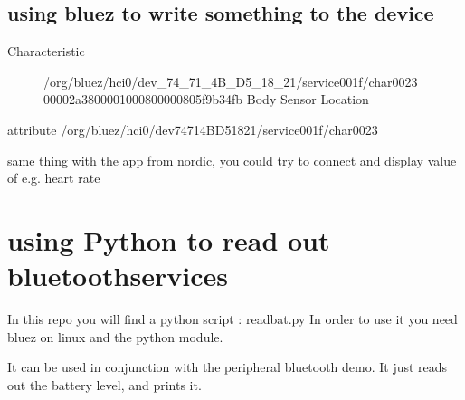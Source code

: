 \documentclass[letterpaper,10pt,english]{sphinxmanual}
\begin{document}
\subsection{using bluez to write something to the device}
\label{\detokenize{bluetooth:using-bluez-to-write-something-to-the-device}}\begin{description}
\item[{Characteristic}] \leavevmode
/org/bluez/hci0/dev\_74\_71\_4B\_D5\_18\_21/service001f/char0023
00002a38\sphinxhyphen{}0000\sphinxhyphen{}1000\sphinxhyphen{}8000\sphinxhyphen{}00805f9b34fb
Body Sensor Location

\end{description}

\begin{sphinxVerbatim}[commandchars=\\\{\}]
 \PYGZhy{}attribute /org/bluez/hci0/dev\PYGZus{}74\PYGZus{}71\PYGZus{}4B\PYGZus{}D5\PYGZus{}18\PYGZus{}21/service001f/char0023
\end{sphinxVerbatim}

same thing with the app from nordic, you could try to connect and display value of e.g. heart rate


\section{using Python to read out bluetoothservices}
\label{\detokenize{bluetooth:using-python-to-read-out-bluetoothservices}}
In this repo you will find a python script : readbat.py
In order to use it you need bluez on linux and the python  module.

It can be used in conjunction with the peripheral bluetooth demo.
It just reads out the battery level, and prints it.

\begin{sphinxVerbatim}[commandchars=\\\{\}]
 
    

  

   

     \PYG{p}{[}\PYG{p}{]}
    
\end{sphinxVerbatim}
\end{document}
